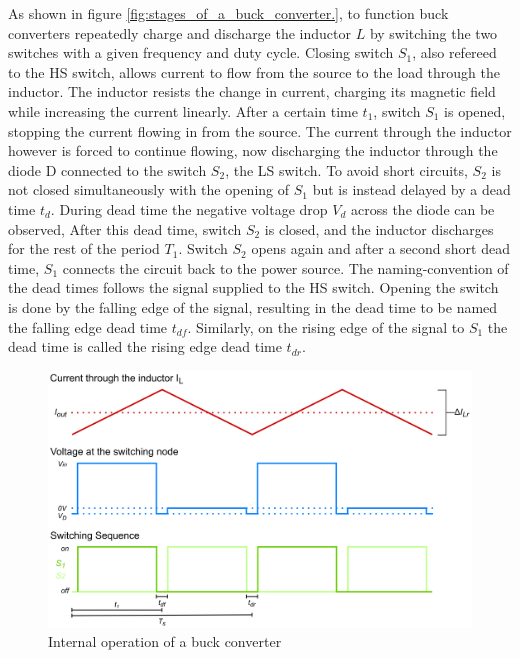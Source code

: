 As shown in figure \ref{fig:stages_of_a_buck_converter.}, to function buck converters repeatedly charge and discharge the inductor $L$ by switching the two switches with a given frequency and duty cycle. Closing switch $S_1$, also refereed to the \ac{HS} switch, allows current to flow from the source to the load through the inductor. The inductor resists the change in current, charging its magnetic field while increasing the current linearly. After a certain time $t_1$, switch $S_1$ is opened, stopping the current flowing in from the source. The current through the inductor however is forced to continue flowing, now discharging the inductor through the diode D connected to the switch $S_2$, the \ac{LS} switch. To avoid short circuits, $S_2$ is not closed simultaneously with the opening of $S_1$ but is instead delayed by a dead time $t_{d}$. During dead time the negative voltage drop $V_d$ across the diode can be observed, After this dead time, switch $S_2$ is closed, and the inductor discharges for the rest of the period $T_1$. Switch $S_2$ opens again and after a second short dead time, $S_1$ connects the circuit back to the power source. The naming-convention of the dead times follows the signal supplied to the \ac{HS} switch. Opening the switch is done by the falling edge of the signal, resulting in the dead time to be named the falling edge dead time $t_{df}$. Similarly, on the rising edge of the signal to $S_1$ the dead time is called the rising edge dead time $t_{dr}$.

\begin{figure}[H]
    \centering
    \includegraphics[width=1\linewidth]{Bilder//Kapitel2/BuckConverter_Stages_1_1.pdf}
    \caption{Internal operation of a buck converter}
    \label{fig:stages_of_a_buck_converter}
\end{figure}

